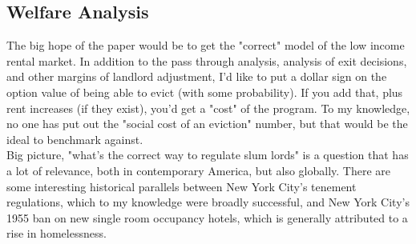 \documentclass{article}
\begin{document}
\subsection{Welfare Analysis}

The big hope of the paper would be to get the "correct" model of the low income rental market. In addition to the pass through analysis, analysis of exit decisions, and other margins of landlord adjustment, I'd like to put a dollar sign on the option value of being able to evict (with some probability). If you add that, plus rent increases (if they exist), you'd get a "cost" of the program. To my knowledge, no one has put out the "social cost of an eviction" number, but that would be the ideal to benchmark against. \\

Big picture, "what's the correct way to regulate slum lords" is a question that has a lot of relevance, both in contemporary America, but also globally. There are some interesting historical parallels between New York City's tenement regulations, which to my knowledge were broadly successful, and New York City's 1955 ban on new single room occupancy hotels, which is generally attributed to a rise in homelessness.
\end{document}
